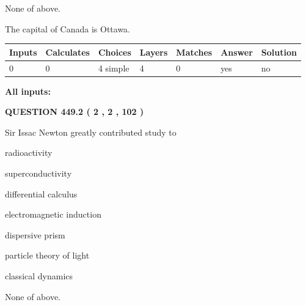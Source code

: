 \documentclass[12pt]{article}
\begin{document}
 
 None of above.
 
 
\noindent{}
 
 
The capital of Canada is Ottawa.
 
 
\noindent{}
 
 
   
   
   
   
\noindent\begin{tabular}{|l|l|l|l|l|l|l|}
 \hline
Inputs & Calculates & Choices & Layers & Matches & Answer & Solution \\ \hline
 0  & 
 0  & 
 4
  simple  
  & 
 4  & 
 0  & 
  yes & 
  no 
  \\ \hline
 \end{tabular}
   
   
   
   
\noindent{}
   
   
   
   
\noindent\vspace{0.1in}\hspace{-0.08in} {\textbf{\Large{All inputs: }}}
   
   
  
\vspace{0.2in}
  
{\textbf{\Large{QUESTION
449.2 
 ( 2 , 2 , 102 )
}}}
  
  
Sir Issac Newton greatly contributed study to
 
 
radioactivity
 
 
superconductivity
 
 
differential calculus
 
 
electromagnetic induction
 
 
dispersive prism
 
 
particle theory of light
 
 
classical dynamics
 
 
 None of above.
 
 
\noindent{}
 
\end{document}
